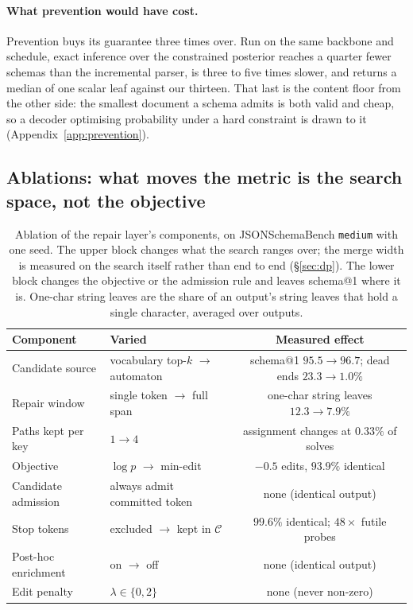 \documentclass{article}
\begin{document}
\paragraph{What prevention would have cost.}
Prevention buys its guarantee three times over. Run on the same backbone and
schedule, exact inference over the constrained posterior reaches a quarter fewer
schemas than the incremental parser, is three to five times slower, and returns a
median of one scalar leaf against our thirteen. That last is the content floor from the other side: the smallest document a schema admits is both valid
and cheap, so a decoder optimising probability under a hard constraint is drawn
to it (Appendix~\ref{app:prevention}).

\subsection{Ablations: what moves the metric is the search space, not the objective}
\label{sec:ablation}


\begin{table}[h]
\centering
\small
\caption{Ablation of the repair layer's components, on JSONSchemaBench
\texttt{medium} with one seed. The upper block changes what the search ranges
over; the merge width is measured on the search itself rather than end to end
(\S\ref{sec:dp}). The lower block changes the objective or the admission rule and
leaves schema@1 where it is. One-char string leaves are the share of an output's
string leaves that hold a single character, averaged over outputs.}
\label{tab:ablation}
\setlength{\tabcolsep}{4pt}
\begin{tabular}{@{}llc@{}}
\toprule
Component & Varied & Measured effect \\
\midrule
Candidate source     & vocabulary top-$k$ $\to$ automaton & schema@1 $95.5\to96.7$; dead ends $23.3\to1.0\%$ \\
Repair window        & single token $\to$ full span       & one-char string leaves $12.3\to7.9\%$ \\
Paths kept per key   & $1 \to 4$                          & assignment changes at $0.33\%$ of solves \\
\midrule
Objective            & $\log p$ $\to$ min-edit            & $-0.5$ edits, $93.9\%$ identical \\
Candidate admission  & always admit committed token       & none (identical output) \\
Stop tokens          & excluded $\to$ kept in $\mathcal{C}$ & $99.6\%$ identical; $48\times$ futile probes \\
Post-hoc enrichment  & on $\to$ off                       & none (identical output) \\
Edit penalty & $\lambda\in\{0,2\}$ & none (never non-zero) \\
\bottomrule
\end{tabular}
\end{table}
\end{document}
